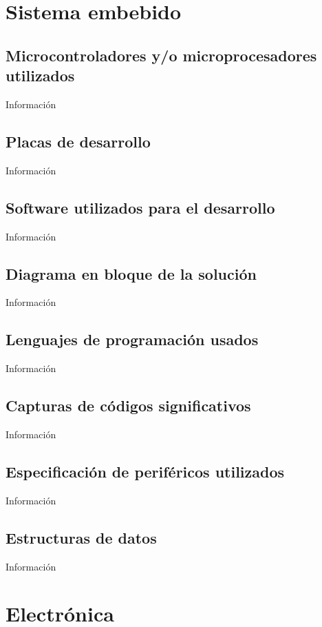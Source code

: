 \documentclass[a4paper,12pt]{report}
\begin{document}






\chapter{Sistema embebido}
\section{Microcontroladores y/o microprocesadores utilizados}
Información

\section{Placas de desarrollo}
Información

\section{Software utilizados para el desarrollo}
Información

\section{Diagrama en bloque de la solución}
Información

\section{Lenguajes de programación usados}
Información

\section{Capturas de códigos significativos}
Información

\section{Especificación de periféricos utilizados}
Información

\section{Estructuras de datos}
Información

\chapter{Electrónica}
\end{document}
